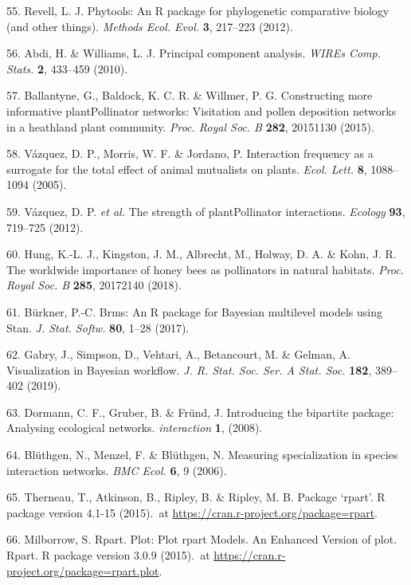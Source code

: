 \documentclass[
  12pt,
  a4paper,
]{article}
\begin{document}
\leavevmode\hypertarget{ref-revell2012}{}%
55. Revell, L. J. Phytools: An R package for phylogenetic comparative biology (and other things). \emph{Methods Ecol. Evol.} \textbf{3}, 217--223 (2012).

\leavevmode\hypertarget{ref-abdi2010}{}%
56. Abdi, H. \& Williams, L. J. Principal component analysis. \emph{WIREs Comp. Stats.} \textbf{2}, 433--459 (2010).

\leavevmode\hypertarget{ref-ballantyne2015}{}%
57. Ballantyne, G., Baldock, K. C. R. \& Willmer, P. G. Constructing more informative plantPollinator networks: Visitation and pollen deposition networks in a heathland plant community. \emph{Proc. Royal Soc. B} \textbf{282}, 20151130 (2015).

\leavevmode\hypertarget{ref-vazquez2005}{}%
58. Vázquez, D. P., Morris, W. F. \& Jordano, P. Interaction frequency as a surrogate for the total effect of animal mutualists on plants. \emph{Ecol. Lett.} \textbf{8}, 1088--1094 (2005).

\leavevmode\hypertarget{ref-vazquez2012}{}%
59. Vázquez, D. P. \emph{et al.} The strength of plantPollinator interactions. \emph{Ecology} \textbf{93}, 719--725 (2012).

\leavevmode\hypertarget{ref-hung2018}{}%
60. Hung, K.-L. J., Kingston, J. M., Albrecht, M., Holway, D. A. \& Kohn, J. R. The worldwide importance of honey bees as pollinators in natural habitats. \emph{Proc. Royal Soc. B} \textbf{285}, 20172140 (2018).

\leavevmode\hypertarget{ref-burkner2017}{}%
61. Bürkner, P.-C. Brms: An R package for Bayesian multilevel models using Stan. \emph{J. Stat. Softw.} \textbf{80}, 1--28 (2017).

\leavevmode\hypertarget{ref-gabry2019}{}%
62. Gabry, J., Simpson, D., Vehtari, A., Betancourt, M. \& Gelman, A. Visualization in Bayesian workflow. \emph{J. R. Stat. Soc. Ser. A Stat. Soc.} \textbf{182}, 389--402 (2019).

\leavevmode\hypertarget{ref-dormann2008}{}%
63. Dormann, C. F., Gruber, B. \& Fründ, J. Introducing the bipartite package: Analysing ecological networks. \emph{interaction} \textbf{1}, (2008).

\leavevmode\hypertarget{ref-bluthgen2006}{}%
64. Blüthgen, N., Menzel, F. \& Blüthgen, N. Measuring specialization in species interaction networks. \emph{BMC Ecol.} \textbf{6}, 9 (2006).

\leavevmode\hypertarget{ref-therneau2015}{}%
65. Therneau, T., Atkinson, B., Ripley, B. \& Ripley, M. B. Package `rpart'. R package version 4.1-15 (2015).~at \href{https://CRAN.R-project.org/package=rpart}{https://cran.r-project.org/package=rpart}.

\leavevmode\hypertarget{ref-milborrow2015}{}%
66. Milborrow, S. Rpart. Plot: Plot rpart Models. An Enhanced Version of plot. Rpart. R package version 3.0.9 (2015).~at \href{https://CRAN.R-project.org/package=rpart.plot}{https://cran.r-project.org/package=rpart.plot}.
\end{document}
